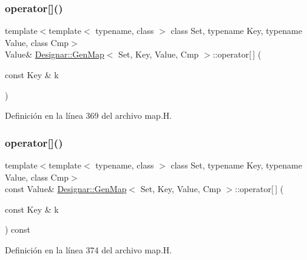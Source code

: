 \subsubsection{\texorpdfstring{operator[]()}{operator[]()}\hspace{0.1cm}{\footnotesize\ttfamily [1/4]}}
{\footnotesize\ttfamily template$<$template$<$ typename, class $>$ class Set, typename Key, typename Value, class Cmp$>$ \\
Value\& \hyperlink{class_designar_1_1_gen_map}{Designar\+::\+Gen\+Map}$<$ Set, Key, Value, Cmp $>$\+::operator\mbox{[}$\,$\mbox{]} (\begin{DoxyParamCaption}\item[{const Key \&}]{k }\end{DoxyParamCaption})\hspace{0.3cm}{\ttfamily [inline]}}



Definición en la línea 369 del archivo map.\+H.

\mbox{\label{class_designar_1_1_gen_map_abff00b60a0488eb655696942069eacbc}} 
\subsubsection{\texorpdfstring{operator[]()}{operator[]()}\hspace{0.1cm}{\footnotesize\ttfamily [2/4]}}
{\footnotesize\ttfamily template$<$template$<$ typename, class $>$ class Set, typename Key, typename Value, class Cmp$>$ \\
const Value\& \hyperlink{class_designar_1_1_gen_map}{Designar\+::\+Gen\+Map}$<$ Set, Key, Value, Cmp $>$\+::operator\mbox{[}$\,$\mbox{]} (\begin{DoxyParamCaption}\item[{const Key \&}]{k }\end{DoxyParamCaption}) const\hspace{0.3cm}{\ttfamily [inline]}}



Definición en la línea 374 del archivo map.\+H.

\mbox{\label{class_designar_1_1_gen_map_a5e5732a2812ff86e6c5e68f26012cc9c}} 
